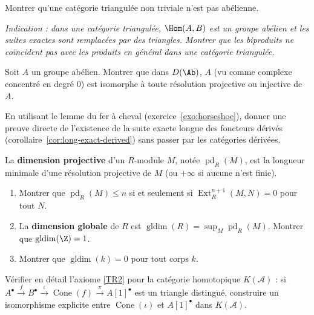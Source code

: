 \begin{exercice}\label{exo:triangulated-abelian}
Montrer qu'une catégorie triangulée non triviale n'est pas abélienne.

\textit{Indication : dans une catégorie triangulée, $\Hom(A, B)$ est
un groupe abélien et les suites exactes sont remplacées par des triangles.
Montrer que les biproduits ne coïncident pas avec les produits en général
dans une catégorie triangulée.}
\end{exercice}

\begin{exercice}\label{exo:derived-category-Z}
Soit $A$ un groupe abélien. Montrer que dans $D(\Ab)$, $A$ (vu comme
complexe concentré en degré $0$) est isomorphe à toute résolution
projective ou injective de $A$.
\end{exercice}

\begin{exercice}\label{exo:horseshoe-derived}
En utilisant le lemme du fer à cheval (exercice~\ref{exo:horseshoe}),
donner une preuve directe de l'existence de la suite exacte longue
des foncteurs dérivés (corollaire~\ref{cor:long-exact-derived})
sans passer par les catégories dérivées.
\end{exercice}

\begin{exercice}\label{exo:dimension-homologique}
La \textbf{dimension projective} d'un
$R$-module $M$, notée $\operatorname{pd}_R(M)$, est la longueur minimale
d'une résolution projective de $M$ (ou $+\infty$ si aucune n'est finie).
\begin{enumerate}[label=(\alph*)]
\item Montrer que $\operatorname{pd}_R(M) \leq n$ si et seulement si
  $\operatorname{Ext}_R^{n+1}(M, N) = 0$ pour tout $N$.
\item La \textbf{dimension globale} de $R$ est
  $\operatorname{gldim}(R) = \sup_M \operatorname{pd}_R(M)$.
  Montrer que $\operatorname{gldim}(\Z) = 1$.
\item Montrer que $\operatorname{gldim}(k) = 0$ pour tout corps $k$.
\end{enumerate}
\end{exercice}

\begin{exercice}\label{exo:rotation-triangle}
Vérifier en détail l'axiome \ref{TR2} pour la catégorie homotopique
$K(\mathcal{A})$ : si $A^\bullet \xrightarrow{f} B^\bullet \xrightarrow{\iota}
\operatorname{Cone}(f) \xrightarrow{\pi} A[1]^\bullet$ est un triangle
distingué, construire un isomorphisme explicite entre
$\operatorname{Cone}(\iota)$ et $A[1]^\bullet$ dans $K(\mathcal{A})$.
\end{exercice}

